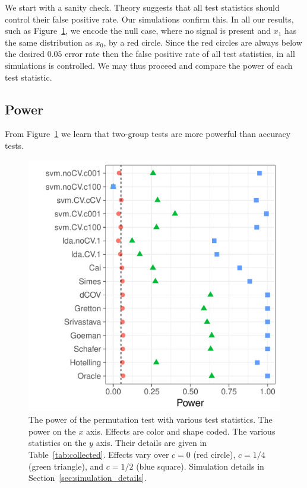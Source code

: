 \documentclass[onecolumn,draftclsnofoot]{IEEEtran}
\begin{document}
We start with a sanity check. 
Theory suggests that all test statistics should control their false positive rate. 
Our simulations confirm this.
In all our results, such as Figure~\ref{fig:simulation_1}, we encode the null case, where no signal is present and $x_1$ has the same distribution as $x_0$, by a red circle. 
Since the red circles are always below the desired $0.05$ error rate then the false positive rate of all test statistics, in all simulations is controlled. 
We may thus proceed and compare the power of each test statistic. 






\subsection{Power}
\label{sec:power}

From Figure~\ref{fig:simulation_1} we learn that two-group tests are more powerful than accuracy tests.

\begin{figure}[h]
	\centering
	\includegraphics[width=0.7\columnwidth]{"art/file2"}
	\caption{
		The power of the permutation test with various test statistics. 
		The power on the $x$ axis. 
		Effects are color and shape coded. 
		The various statistics on the $y$ axis. 
		Their details are given in Table~\ref{tab:collected}. 
		Effects vary over $c=0$ (red circle), $c=1/4$ (green triangle), and $c=1/2$ (blue square). 
		Simulation details in Section~\ref{sec:simulation_details}.}	
	\label{fig:simulation_1}
\end{figure}
\end{document}
